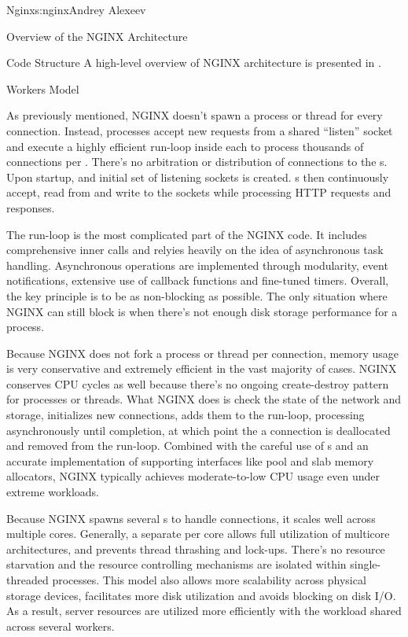 \begin{aosachapter}{Nginx}{s:nginx}{Andrey Alexeev}
\begin{aosasect1}{Overview of the NGINX Architecture}
\begin{aosasect2}{Code Structure}
A high-level overview of NGINX architecture is presented in
.


\end{aosasect2}

\begin{aosasect2}{Workers Model}

As previously mentioned, NGINX doesn't spawn a process or thread for
every connection. Instead,  processes accept new requests
from a shared ``listen'' socket and execute a highly efficient
run-loop inside each  to process thousands of connections
per . There's no arbitration or distribution of
connections to the s. Upon startup, and initial set of
listening sockets is created. s then continuously accept,
read from and write to the sockets while processing HTTP requests and
responses.

The run-loop is the most complicated part of the NGINX 
code. It includes comprehensive inner calls and relyies heavily on the
idea of asynchronous task handling. Asynchronous operations are
implemented through modularity, event notifications, extensive use of
callback functions and fine-tuned timers. Overall, the key principle
is to be as non-blocking as possible. The only situation where NGINX
can still block is when there's not enough disk storage performance
for a  process.

Because NGINX does not fork a process or thread per connection, memory
usage is very conservative and extremely efficient in the vast
majority of cases. NGINX conserves CPU cycles as well because there's
no ongoing create-destroy pattern for processes or threads. What NGINX
does is check the state of the network and storage, initializes new
connections, adds them to the run-loop, processing asynchronously
until completion, at which point the a connection is deallocated and
removed from the run-loop. Combined with the careful use of
s and an accurate implementation of supporting
interfaces like pool and slab memory allocators, NGINX typically
achieves moderate-to-low CPU usage even under extreme workloads.

Because NGINX spawns several s to handle connections, it
scales well across multiple cores. Generally, a separate 
per core allows full utilization of multicore architectures, and
prevents thread thrashing and lock-ups. There's no resource starvation
and the resource controlling mechanisms are isolated within
single-threaded  processes. This model also allows more
scalability across physical storage devices, facilitates more disk
utilization and avoids blocking on disk I/O. As a result, server
resources are utilized more efficiently with the workload shared
across several workers.


\end{aosasect2}
\end{aosasect1}
\end{aosachapter}
